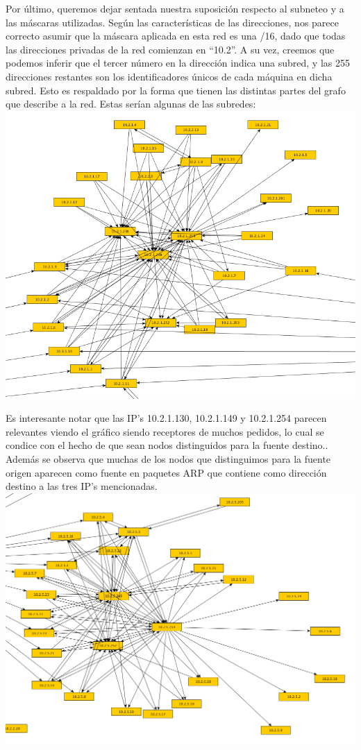 \newpage
\indent Por último, queremos dejar sentada nuestra suposición respecto al subneteo y a las máscaras utilizadas. Según las características de las direcciones, nos parece correcto asumir que la máscara aplicada en esta red es una /16, dado que todas las direcciones privadas de la red comienzan en ``10.2''. A su vez, creemos que podemos inferir que el tercer número en la dirección indica una subred, y las 255 direcciones restantes son los identificadores únicos de cada máquina en dicha subred. Esto es respaldado por la forma que tienen las distintas partes del grafo que describe a la red. Estas serían algunas de las subredes:\\

\includegraphics[scale=0.5,clip=true,trim=140 0 0 0]{graphics/subnet_1.png}

\indent Es interesante notar que las IP's 10.2.1.130, 10.2.1.149 y 10.2.1.254 parecen relevantes viendo el gráfico siendo receptores de muchos pedidos, lo cual se condice con el hecho de que sean nodos distinguidos para la fuente destino.. Además se observa que muchas de los nodos que distinguimos para la fuente origen aparecen como fuente en paquetes ARP que contiene como dirección destino a las tres IP's mencionadas.\\


\includegraphics[scale=0.5,clip=true,trim=140 0 0 0]{graphics/subnet_5.png}

